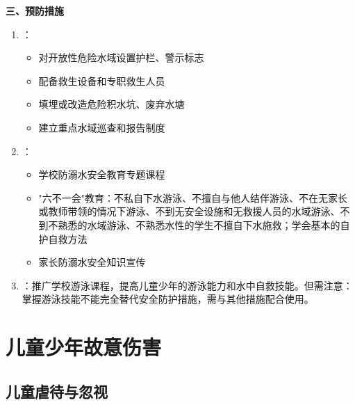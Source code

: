 \begin{keybox}
\textbf{三、预防措施}
\begin{enumerate}[leftmargin=*]
    \item {}：
    \begin{itemize}
        \item 对开放性危险水域设置护栏、警示标志
        \item 配备救生设备和专职救生人员
        \item 填埋或改造危险积水坑、废弃水塘
        \item 建立重点水域巡查和报告制度
    \end{itemize}
    \item {}：
    \begin{itemize}
        \item 学校防溺水安全教育专题课程
        \item "六不一会"教育：不私自下水游泳、不擅自与他人结伴游泳、不在无家长或教师带领的情况下游泳、不到无安全设施和无救援人员的水域游泳、不到不熟悉的水域游泳、不熟悉水性的学生不擅自下水施救；学会基本的自护自救方法
        \item 家长防溺水安全知识宣传
    \end{itemize}
    \item {}：推广学校游泳课程，提高儿童少年的游泳能力和水中自救技能。但需注意：掌握游泳技能不能完全替代安全防护措施，需与其他措施配合使用。
\end{enumerate}
\end{keybox}

\section{儿童少年故意伤害}

\subsection{儿童虐待与忽视}

